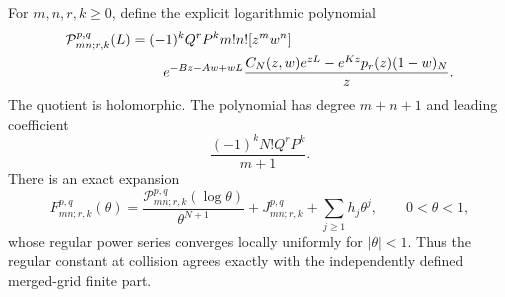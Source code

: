 \begin{theorem}
\label{xid:cld:collision-expansion}
For $m,n,r,k\ge0$, define the explicit logarithmic polynomial
\begin{align}
 \mathcal P_{mn;r,k}^{p,q}(L)
 ={}&(-1)^kQ^rP^k m!n![z^mw^n]\notag\\
 &\quad e^{-Bz-Aw+wL}
       \frac{C_N(z,w)e^{zL}-e^{Kz}p_r(z)(1-w)_N}{z}.
 \label{xid:cld:collision-polynomial}
\end{align}
The quotient is holomorphic.  The polynomial has degree $m+n+1$ and
leading coefficient
\[
 \frac{(-1)^kN!Q^rP^k}{m+1}.
\]
There is an exact expansion
\begin{equation}
 F_{mn;r,k}^{p,q}(\theta)
 =\frac{\mathcal P_{mn;r,k}^{p,q}(\log\theta)}{\theta^{N+1}}
       +J_{mn;r,k}^{p,q}+\sum_{j\ge1}h_j\theta^j,
 \qquad 0<\theta<1,
 \label{xid:cld:collision-expansion-equation}
\end{equation}
whose regular power series converges locally uniformly for $|\theta|<1$.
Thus the regular constant at collision agrees exactly with the
independently defined merged-grid finite part.
\end{theorem}

